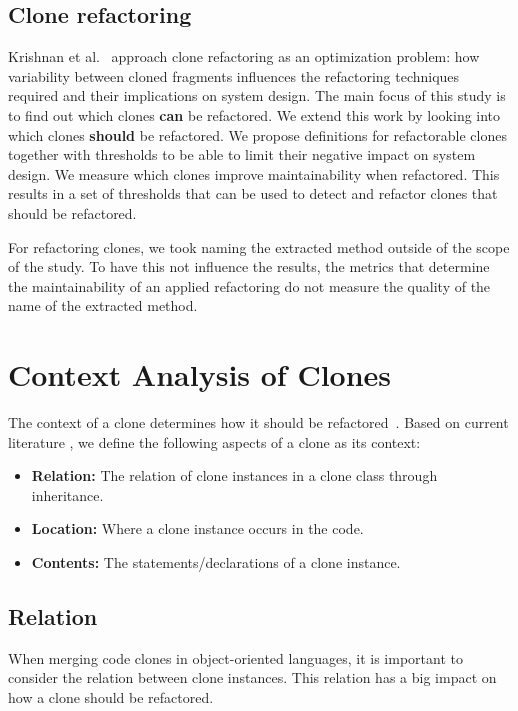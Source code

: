 \documentclass[runningheads]{llncs}
\begin{document}
\subsection{Clone refactoring}
Krishnan et al.~\cite{krishnan2013refactoring} approach clone refactoring as an optimization problem: how variability between cloned fragments influences the refactoring techniques required and their implications on system design. The main focus of this study is to find out which clones \textbf{can} be refactored. We extend this work by looking into which clones \textbf{should} be refactored. We propose definitions for refactorable clones together with thresholds to be able to limit their negative impact on system design. We measure which clones improve maintainability when refactored. This results in a set of thresholds that can be used to detect and refactor clones that should be refactored.

For refactoring clones, we took naming the extracted method outside of the scope of the study. To have this not influence the results, the metrics that determine the maintainability of an applied refactoring do not measure the quality of the name of the extracted method. 

\section{Context Analysis of Clones}\label{chap:contextsetup}
The context of a clone determines how it should be refactored~\cite{fowler2018refactoring}. Based on current literature \cite{fontana2012duplicated, fontana2015duplicated}, we define the following aspects of a clone as its context:
\begin{itemize}
  \item \textbf{Relation:} The relation of clone instances in a clone class through inheritance.
  \item \textbf{Location:} Where a clone instance occurs in the code.
  \item \textbf{Contents:} The statements/declarations of a clone instance.
\end{itemize}

\subsection{Relation}\label{sec:setuprelation}
When merging code clones in object-oriented languages, it is important to consider the relation between clone instances. This relation has a big impact on how a clone should be refactored.
\end{document}
